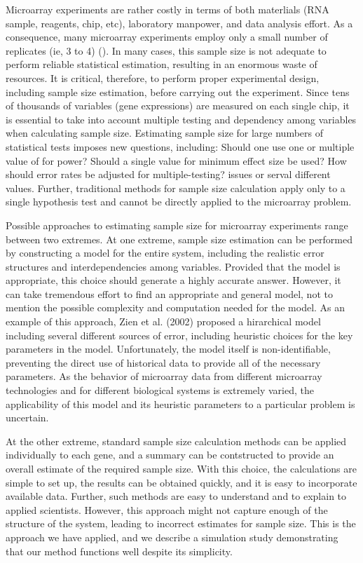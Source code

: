 \documentclass{bioinfo}
\begin{document}
Microarray experiments are rather costly in terms of both materlials
(RNA sample, reagents, chip, etc), laboratory manpower, and data
analysis effort.  As a consequence, many microarray experiments employ
only a small number of replicates (ie, 3 to 4) (\citealp{Mandel03}).
In many cases, this sample size is not adequate to perform reliable
statistical estimation, resulting in an enormous waste of resources.
It is critical, therefore, to perform proper experimental design,
including sample size estimation, before carrying out the experiment.
Since tens of thousands of variables (gene expressions) are measured
on each single chip, it is essential to take into account multiple
testing and dependency among variables when calculating sample size.
Estimating sample size for large numbers of statistical tests imposes
new questions, including: Should one use one or multiple value of for
power? Should a single value for minimum effect size be used?  How
should error rates be adjusted for multiple-testing?  issues or serval
different values.  Further, traditional methods for sample size
calculation apply only to a single hypothesis test and cannot be
directly applied to the microarray problem.

Possible approaches to estimating sample size for microarray
experiments range between two extremes. At one extreme, sample size
estimation can be performed by constructing a model for the entire
system, including the realistic error structures and interdependencies
among variables. Provided that the model is appropriate, this choice
should generate a highly accurate answer. However, it can take
tremendous effort to find an appropriate and general model, not to
mention the possible complexity and computation needed for the model.
As an example of this approach, Zien et al.  (2002) proposed a
hirarchical model including several different sources of error,
including heuristic choices for the key parameters in the model.
Unfortunately, the model itself is non-identifiable, preventing the
direct use of historical data to provide all of the necessary
parameters.  As the behavior of microarray data from different
microarray technologies and for different biological systems is
extremely varied, the applicability of this model and its heuristic
parameters to a particular problem is uncertain.

At the other extreme, standard sample size calculation methods can be
applied individually to each gene, and a summary can be contstructed
to provide an overall estimate of the required sample size.  With this
choice, the calculations are simple to set up, the results can be
obtained quickly, and it is easy to incorporate available data.
Further, such methods are easy to understand and to explain to applied
scientists.  However, this approach might not capture enough of the
structure of the system, leading to incorrect estimates for sample
size.  This is the approach we have applied, and we describe a
simulation study demonstrating that our method functions well despite
its simplicity.
\end{document}
